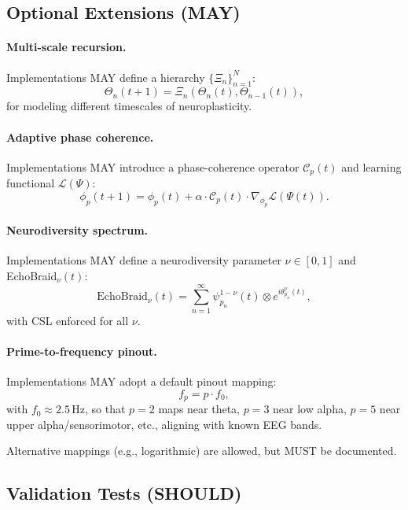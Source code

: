 \documentclass[11pt]{article}
\begin{document}
\subsection{Optional Extensions (MAY)}

\paragraph{Multi-scale recursion.}

Implementations MAY define a hierarchy $\{\Xi_n\}_{n=1}^N$:
\[
\Theta_n(t+1) = \Xi_n(\Theta_n(t), \Theta_{n-1}(t)),
\]
for modeling different timescales of neuroplasticity.

\paragraph{Adaptive phase coherence.}

Implementations MAY introduce a phase-coherence operator $\mathcal{C}_p(t)$ and learning functional $\mathcal{L}(\Psi)$:
\[
\phi_p(t+1) = \phi_p(t) + \alpha \cdot \mathcal{C}_p(t) \cdot \nabla_{\phi_p} \mathcal{L}(\Psi(t)).
\]

\paragraph{Neurodiversity spectrum.}

Implementations MAY define a neurodiversity parameter $\nu \in [0,1]$ and EchoBraid$_\nu(t)$:
\[
\mathrm{EchoBraid}_\nu(t) = \sum_{n=1}^{\infty} \psi_{p_n}^{1-\nu}(t) \otimes e^{i \theta_{p_n}^\nu(t)},
\]
with CSL enforced for all $\nu$.

\paragraph{Prime-to-frequency pinout.}

Implementations MAY adopt a default pinout mapping:
\[
f_p = p \cdot f_0,
\]
with $f_0 \approx 2.5\,\text{Hz}$, so that $p=2$ maps near theta, $p=3$ near low alpha, $p=5$ near upper alpha/sensorimotor, etc., aligning with known EEG bands. \cite{GoldenEEG,EEGEntropyASD2}

Alternative mappings (e.g., logarithmic) are allowed, but MUST be documented.

\subsection{Validation Tests (SHOULD)}
\end{document}
